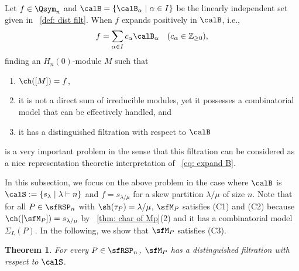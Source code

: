 \documentclass[12pt, reqno]{amsart}
\newtheorem{theorem}{Theorem}[section]
\theoremstyle{definition}
\numberwithin{equation}{section} \numberwithin{figure}{section}
\numberwithin{table}{section}
\def\Z{\mathbb Z}
\begin{document}
Let $f \in \Qsym_n$ and $\calB = \{\calB_\alpha \mid \alpha \in I \}$ be the linearly independent set given in ~\cref{def: dist filt}.
When $f$ expands positively in $\calB$, i.e., 
\begin{align}\label{eq: expand B}
f = \sum_{\alpha \in I} c_\alpha \calB_\alpha \quad (c_\alpha \in \Z_{\geq 0}),
\end{align}
finding an $H_n(0)$-module $M$ such that 
\begin{enumerate}[label = {\rm (C\arabic*)}]
\item $\ch([M]) = f$,
\item it is not a direct sum of irreducible modules, yet it possesses a combinatorial model that can be effectively handled, and
\item it has a distinguished filtration with respect to $\calB$
\end{enumerate}
is a very important problem in the sense that 
this filtration can be considered as a nice representation theoretic interpretation of ~\cref{eq: expand B}.

In this subsection, we focus on the above problem in the case where $\calB$ is $\calS := \{s_{\lambda} \mid \lambda \vdash n \}$ and $f = s_{\lambda/\mu}$ for a skew partition $\lambda/\mu$ of size $n$.
Note that for all $P \in \sfRSP_n$ with 
$\sh(\tau_P) = \lambda/\mu$,
$\sfM_P$ satisfies (C1) and (C2) because $\ch([\sfM_P]) = s_{\lambda/\mu}$ by ~\cref{thm: char of Mp}(2) and it has a combinatorial model $\Sigma_L(P)$.
In the following, we show that $\sfM_P$ satisfies (C3).







\begin{theorem}\label{thm: filt of X lam mu}
For every $P \in \sfRSP_n$,
$\sfM_P$ has a distinguished filtration  with respect to $\calS$.
\end{theorem}
\end{document}
